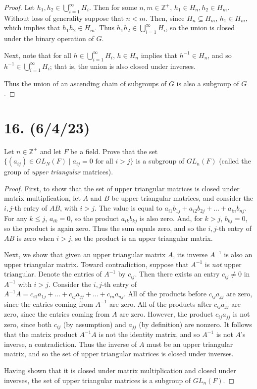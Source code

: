 \documentclass{article}
\begin{document}
\begin{proof}
    Let $h_1, h_2 \in \bigcup^\infty_{i = 1}{H_i}$. Then for some $n, m \in \mathbb{Z}^+$, $h_1 \in H_n, h_2 \in H_m$. Without loss of generality suppose that $n < m$. Then, since $H_n \subseteq H_m$, $h_1 \in H_m$, which implies that $h_1 h_2 \in H_m$. Thus $h_1 h_2 \in \bigcup^\infty_{i = 1}{H_i}$, so the union is closed under the binary operation of $G$.

    Next, note that for all $h \in \bigcup^\infty_{i = 1}{H_i}$, $h \in H_n$ implies that $h^{-1} \in H_n$, and so $h^{-1} \in \bigcup^\infty_{i = 1}{H_i}$; that is, the union is also closed under inverses.

    Thus the union of an ascending chain of subgroups of $G$ is also a subgroup of $G$.
\end{proof}

\section*{16. (6/4/23)}

Let $n \in \mathbb{Z}^+$ and let $F$ be a field. Prove that the set $\{ (a_{ij}) \in GL_N(F) \mid a_{ij} = 0 \text{ for all } i > j \}$ is a subgroup of $GL_n(F)$ (called the group of \emph{upper triangular} matrices).

\begin{proof}
    First, to show that the set of upper triangular matrices is closed under matrix multiplication, let $A$ and $B$ be upper triangular matrices, and consider the $i,j$-th entry of $AB$, with $i > j$. The value is equal to $a_{i1}b_{1j} + a_{i2}b_{2j} + ... + a_{in}b_{nj}$. For any $k \leq j$, $a_{ik} = 0$, so the product $a_{ik}b_{kj}$ is also zero. And, for $k > j$, $b_{kj} = 0$, so the product is again zero. Thus the sum equals zero, and so the $i,j$-th entry of $AB$ is zero when $i > j$, so the product is an upper triangular matrix.

    Next, we show that given an upper triangular matrix $A$, its inverse $A^{-1}$ is also an upper triangular matrix. Toward contradiction, suppose that $A^{-1}$ is \emph{not} upper triangular. Denote the entries of $A^{-1}$ by $c_{ij}$. Then there exists an entry $c_{ij} \neq 0$ in $A^{-1}$ with $i > j$. Consider the $i,j$-th entry of $A^{-1}A = c_{i1}a_{1j} + ... + c_{ij}a_{jj} + ... + c_{in}a_{nj}$. All of the products before $c_{ij}a_{jj}$ are zero, since the entries coming from $A^{-1}$ are zero. All of the products after $c_{ij}a_{jj}$ are zero, since the entries coming from $A$ are zero. However, the product $c_{ij}a_{jj}$ is not zero, since both $c_{ij}$ (by assumption) and $a_{jj}$ (by definition) are nonzero. It follows that the matrix product $A^{-1}A$ is not the identity matrix, and so $A^{-1}$ is not $A$'s inverse, a contradiction. Thus the inverse of $A$ must be an upper triangular matrix, and so the set of upper triangular matrices is closed under inverses.

    Having shown that it is closed under matrix multiplication and closed under inverses, the set of upper triangular matrices is a subgroup of $GL_n(F)$.
\end{proof}
\end{document}
